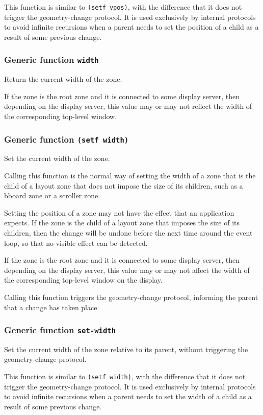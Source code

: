 \documentclass{report}
\begin{document}
This function is similar to \texttt{(setf vpos)}, with the difference
that it does not trigger the geometry-change protocol.  It is used
exclusively by internal protocols to avoid infinite recursions when a
parent needs to set the position of a child as a result of some
previous change.

\subsubsection{Generic function \texttt{width}}

Return the current width of the zone.  

If the zone is the root zone and it is connected to some display
server, then depending on the display server, this value may or
may not reflect the width of the corresponding top-level window.

\subsubsection{Generic function \texttt{(setf width)}}

Set the current width of the zone.

Calling this function is the normal way of setting the width of a
zone that is the child of a layout zone that does not impose the
size of its children, such as a bboard zone or a scroller zone.

Setting the position of a zone may not have the effect that an
application expects.  If the zone is the child of a layout zone
that imposes the size of its children, then the change will be
undone before the next time around the event loop, so that no
visible effect can be detected.

If the zone is the root zone and it is connected to some display
server, then depending on the display server, this value may or
may not affect the width of the corresponding top-level window
on the display.

Calling this function triggers the geometry-change protocol,
informing the parent that a change has taken place.  

\subsubsection{Generic function \texttt{set-width}}

Set the current width of the zone relative to its parent, without
triggering the geometry-change protocol.

This function is similar to \texttt{(setf width)}, with the difference
that it does not trigger the geometry-change protocol.  It is used
exclusively by internal protocols to avoid infinite recursions when a
parent needs to set the width of a child as a result of some previous
change.
\end{document}
